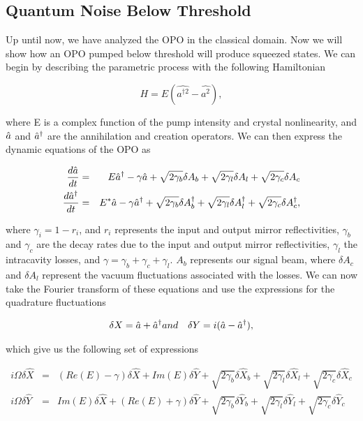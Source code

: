 \subsection{Quantum Noise Below Threshold}
\label{quantum_noise_below_threshold} 

Up until now, we have analyzed the OPO in the classical domain.  Now we will show how an OPO pumped below threshold will produce squeezed states.  We can begin by describing the parametric process with the following Hamiltonian

\begin{equation}
  \label{eq:pdc_hamilton}
  H = E (\hat{a^{\dagger 2}} - \hat{a^2}),
\end{equation}

\noindent
where E is a complex function of the pump intensity and crystal nonlinearity, and $\hat{a}$ and $\hat{a}^\dagger$ are the annihilation and creation operators.  We can then express the dynamic equations of the OPO as \cite{LamPhD}

\begin{eqnarray}
  \label{eq:opo_dyn}
  \frac{d \hat{a}}{d t} &=& E \hat{a}^\dagger - \gamma \hat{a} + \sqrt{2 \gamma_b} \delta A_b + \sqrt{2 \gamma_l} \delta A_l + \sqrt{2 \gamma_c} \delta A_c  \\
\frac{d \hat{a}^\dagger}{d t} &=& E^* \hat{a} - \gamma \hat{a}^\dagger + \sqrt{2 \gamma_b} \delta
A_b^\dagger + \sqrt{2 \gamma_l} \delta A_l^\dagger + \sqrt{2 \gamma_c} \delta
A_c^\dagger  ,
\end{eqnarray}

\noindent
where $\gamma_i = 1 - r_i$, and $r_i$ represents the input and output mirror reflectivities, $\gamma_b$ and $\gamma_c$ are the decay rates due to the input and output mirror reflectivities, $\gamma_l$ the intracavity losses, and $\gamma = \gamma_b + \gamma_c + \gamma_l$.  $A_b$ represents our signal beam, where $\delta A_c$ and $\delta A_l$  represent the vacuum fluctuations associated with the losses. We can now take the Fourier transform of these equations and use the expressions for the quadrature fluctuations

\begin{eqnarray}
  \label{eq:quad}
  \delta X = \hat{a} + \hat{a}^\dagger & and & \delta Y = i(\hat{a} - \hat{a}^\dagger),
\end{eqnarray}

\noindent
which give us the following set of expressions

\begin{eqnarray}
  \label{eq:quant_opo}
  i \Omega \delta \hat{X} \!\!&=&\!\! \left(Re(E) - \gamma \right) \delta \hat{X} + Im(E) \delta \hat{Y} + \sqrt{2 \gamma_b} \delta \hat{X}_b + \sqrt{2 \gamma_l} \delta \hat{X}_l + \sqrt{2 \gamma_c} \delta \hat{X}_c \\
  i \Omega \delta \hat{Y} \!\!&=&\!\! Im(E) \delta \hat{X} + \left( Re(E) + \gamma \right) \delta \hat{Y} + \sqrt{2 \gamma_b} \delta \hat{Y}_b + \sqrt{2 \gamma_l} \delta \hat{Y}_l + \sqrt{2 \gamma_c} \delta \hat{Y}_c 
\end{eqnarray}

